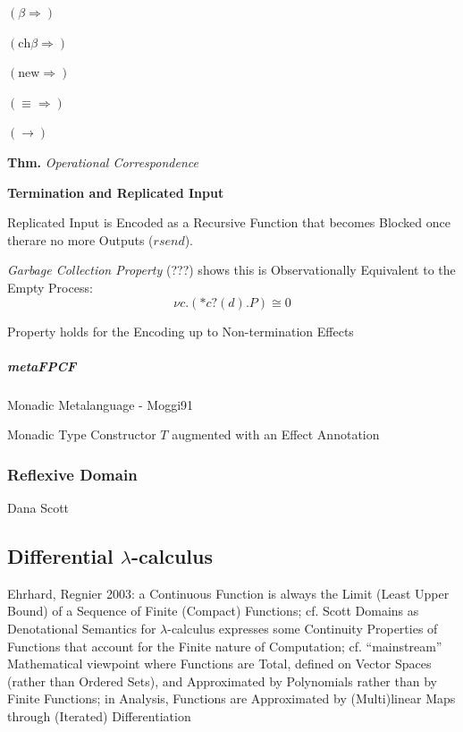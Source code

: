 $(\beta\Rightarrow)$

$(\text{ch}\beta\Rightarrow)$

$(\text{new}\Rightarrow)$

$(\equiv\Rightarrow)$

$(\rightarrow)$

\textbf{Thm.} \emph{Operational Correspondence}


\textbf{Termination and Replicated Input}

Replicated Input is Encoded as a Recursive Function that becomes
Blocked once therare no more Outputs ($rsend$).

\emph{Garbage Collection Property} (???) shows this is Observationally
Equivalent to the Empty Process:
\[
  \nu c.(*c?(d).P) \cong 0
\]

Property holds for the Encoding up to Non-termination Effects %



\subparagraph{metaFPCF}\label{sec:meta_fpcf}\hfill

\cite{orchard-yoshida16}

Monadic Metalanguage - Moggi91 %

Monadic Type Constructor $T$ augmented with an Effect Annotation
\cite{wadler-thiemann03}



\subsubsection{Reflexive Domain}\label{sec:reflexive_domain}

Dana Scott %



\subsection{Differential $\lambda$-calculus}\label{sec:differential_lambda}

Ehrhard, Regnier 2003:
a Continuous Function is always the Limit (Least Upper Bound) of a Sequence of
Finite (Compact) Functions; cf. Scott Domains as Denotational Semantics for
$\lambda$-calculus expresses some Continuity Properties of Functions that
account for the Finite nature of Computation; cf. ``mainstream'' Mathematical
viewpoint where Functions are Total, defined on Vector Spaces (rather than
Ordered Sets), and Approximated by Polynomials rather than by Finite Functions;
in Analysis, Functions are Approximated by (Multi)linear Maps through (Iterated)
Differentiation


